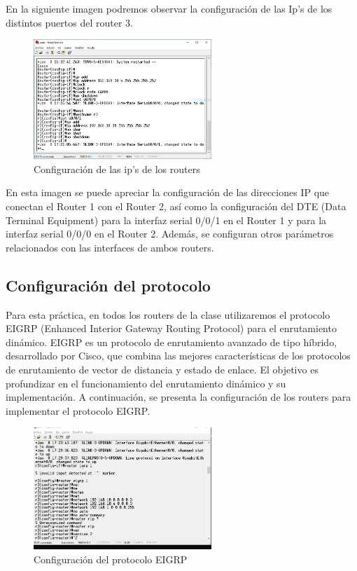         En la siguiente imagen podremos observar la configuración de las Ip's de los distintos puertos del router 3.
        \begin{figure}[H]
            \centering
            \includegraphics[width=0.6\textwidth]{img/routerip.png}
            \caption{Configuración de las ip's de los routers}
            \label{fig:router}
        \end{figure}
        En esta imagen se puede apreciar la configuración de las direcciones IP que conectan el Router 1 con el Router 2, así como la configuración del DTE (Data Terminal Equipment) para la interfaz serial 0/0/1 en el Router 1 y para la interfaz serial 0/0/0 en el Router 2. Además, se configuran otros parámetros relacionados con las interfaces de ambos routers.

    \subsection{Configuración del protocolo}

    Para esta práctica, en todos los routers de la clase utilizaremos el protocolo EIGRP (Enhanced Interior Gateway Routing Protocol) para el enrutamiento dinámico. EIGRP es un protocolo de enrutamiento avanzado de tipo híbrido, desarrollado por Cisco, que combina las mejores características de los protocolos de enrutamiento de vector de distancia y estado de enlace. El objetivo es profundizar en el funcionamiento del enrutamiento dinámico y su implementación. A continuación, se presenta la configuración de los routers para implementar el protocolo EIGRP.

    \begin{figure}[H]
        \centering
        \includegraphics[width=0.6\textwidth]{img/eigrp.png}
        \caption{Configuración del protocolo EIGRP}
        \label{fig:eigrp}
    \end{figure}

